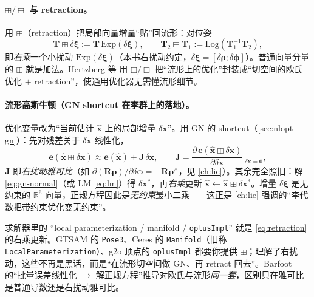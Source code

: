 \paragraph{$\boxplus/\boxminus$ 与 retraction。}\cite{hertzberg2013integrating}
用 \emph{$\boxplus$}（retraction）把局部向量增量“贴”回流形：对位姿
\begin{equation}
  \mathbf{T}\boxplus\delta\boldsymbol{\xi}:=\mathbf{T}\,\mathrm{Exp}(\delta\boldsymbol{\xi}),\qquad
  \mathbf{T}_2\boxminus\mathbf{T}_1:=\mathrm{Log}(\mathbf{T}_1^{-1}\mathbf{T}_2),
  \label{eq:retraction}
\end{equation}
即\emph{右乘}一个小扰动 $\mathrm{Exp}(\delta\boldsymbol{\xi})$（本书右扰动约定，$\delta\boldsymbol{\xi}=[\delta\boldsymbol{\rho};\delta\boldsymbol{\phi}]$）。普通向量分量的 $\boxplus$ 就是加法。Hertzberg 等\cite{hertzberg2013integrating} 用 $\boxplus/\boxminus$ 把“流形上的优化”封装成“切空间的欧氏优化 $+$ retraction”，使通用优化器无需懂流形细节。

\paragraph{流形高斯牛顿（GN shortcut 在李群上的落地）。}\cite{barfoot2024state,gaoxiang2019slam14}
优化变量改为“当前估计 $\hat{\mathbf{x}}$ 上的局部增量 $\delta\mathbf{x}$”。用 GN 的 shortcut（\cref{sec:nlopt-gn}）：先对残差关于 $\delta\mathbf{x}$ 线性化，
\begin{equation}
  \mathbf{e}(\hat{\mathbf{x}}\boxplus\delta\mathbf{x})\approx\mathbf{e}(\hat{\mathbf{x}})+\mathbf{J}\,\delta\mathbf{x},\qquad
  \mathbf{J}=\frac{\partial\,\mathbf{e}(\hat{\mathbf{x}}\boxplus\delta\mathbf{x})}{\partial\delta\mathbf{x}}\bigg|_{\delta\mathbf{x}=\mathbf{0}},
  \label{eq:manifold-jac}
\end{equation}
$\mathbf{J}$ 即\emph{右扰动雅可比}（如 $\partial(\mathbf{R}\mathbf{p})/\partial\delta\boldsymbol{\phi}=-\mathbf{R}\mathbf{p}^\wedge$，见 \cref{ch:lie}）。其余完全照旧：解 \cref{eq:gn-normal}（或 LM \cref{eq:lm}）得 $\delta\mathbf{x}^*$，再\emph{右乘}更新 $\hat{\mathbf{x}}\leftarrow\hat{\mathbf{x}}\boxplus\delta\mathbf{x}^*$。增量 $\delta\boldsymbol{\xi}$ 是无约束的 $\mathbb{R}^6$ 向量，正规方程因此是\emph{无约束}最小二乘——这正是 \cref{ch:lie} 强调的“李代数把带约束优化变无约束”。

\begin{insight}
求解器里的 “local parameterization / manifold / \texttt{oplusImpl}” 就是 \cref{eq:retraction} 的右乘更新。GTSAM 的 \texttt{Pose3}、Ceres 的 \texttt{Manifold}（旧称 \texttt{LocalParameterization}）、g2o 顶点的 \texttt{oplusImpl} 都要你提供 $\boxplus$；理解了右扰动，这些不再是黑话，而是“在流形切空间做 GN、再 retract 回去”。Barfoot\cite{barfoot2024state} 的“批量误差线性化 $\to$ 解正规方程”推导对欧氏与流形\emph{同一套}，区别只在雅可比是普通导数还是右扰动雅可比。
\end{insight}

